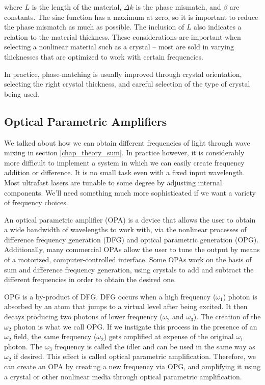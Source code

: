 where $L$ is the length of the material, $\Delta k$ is the phase mismatch, and $\beta$ are constants. The sinc function has a maximum at zero, so it is important to reduce the phase mismatch as much as possible. The inclusion of $L$ also indicates a relation to the material thickness. These considerations are important when selecting a nonlinear material such as a crystal -- most are sold in varying thicknesses that are optimized to work with certain frequencies.

In practice, phase-matching is usually improved through crystal orientation, selecting the right crystal thickness, and careful selection of the type of crystal being used.

\subsection{Optical Parametric Amplifiers}
We talked about how we can obtain different frequencies of light through wave mixing in section \ref{chap_theory_sum}. In practice however, it is considerably more difficult to implement a system in which we can easily create frequency addition or difference. It is no small task even with a fixed input wavelength. Most ultrafast lasers are tunable to some degree by adjusting internal components. We'll need something much more sophisticated if we want a variety of frequency choices.

An optical parametric amplifier (OPA) is a device that allows the user to obtain a wide bandwidth of wavelengths to work with, via the nonlinear processes of difference frequency generation (DFG) and optical parametric generation (OPG). Additionally, many commercial OPAs allow the user to tune the output by means of a motorized, computer-controlled interface. Some OPAs work on the basis of sum and difference frequency generation, using crystals to add and subtract the different frequencies in order to obtain the desired one.

OPG is a by-product of DFG. DFG occurs when a high frequency ($\omega_{1}$) photon is absorbed by an atom that jumps to a virtual level after being excited. It then decays producing two photons of lower frequency ($\omega_{2}$ and $\omega_{3}$). The creation of the $\omega_{2}$ photon is what we call OPG. If we instigate this process in the presence of an $\omega_{2}$ field, the same frequency ($\omega_{2}$) gets amplified at expense of the original $\omega_{1}$ photon. The $\omega_{3}$ frequency is called the idler and can be used in the same way as $\omega_{2}$ if desired. This effect is called optical parametric amplification. Therefore, we can create an OPA by creating a new frequency via OPG, and amplifying it using a crystal or other nonlinear media through optical parametric amplification. 

